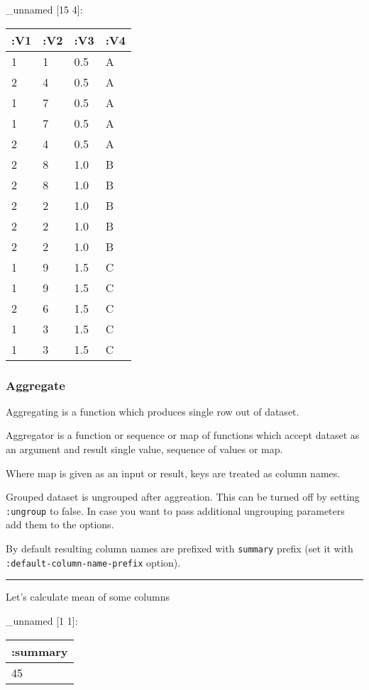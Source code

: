 \documentclass[]{article}
\newenvironment{Shaded}{\begin{snugshade}}{\end{snugshade}}
\newcommand{\AttributeTok}[1]{\textcolor[rgb]{0.77,0.63,0.00}{#1}}
\newcommand{\KeywordTok}[1]{\textcolor[rgb]{0.13,0.29,0.53}{\textbf{#1}}}
\newcommand{\NormalTok}[1]{#1}
\newcommand{\VariableTok}[1]{\textcolor[rgb]{0.00,0.00,0.00}{#1}}
\begin{document}
\_unnamed {[}15 4{]}:

\begin{longtable}[]{@{}llll@{}}
\toprule
:V1 & :V2 & :V3 & :V4\tabularnewline
\midrule
\endhead
1 & 1 & 0.5 & A\tabularnewline
2 & 4 & 0.5 & A\tabularnewline
1 & 7 & 0.5 & A\tabularnewline
1 & 7 & 0.5 & A\tabularnewline
2 & 4 & 0.5 & A\tabularnewline
2 & 8 & 1.0 & B\tabularnewline
2 & 8 & 1.0 & B\tabularnewline
2 & 2 & 1.0 & B\tabularnewline
2 & 2 & 1.0 & B\tabularnewline
2 & 2 & 1.0 & B\tabularnewline
1 & 9 & 1.5 & C\tabularnewline
1 & 9 & 1.5 & C\tabularnewline
2 & 6 & 1.5 & C\tabularnewline
1 & 3 & 1.5 & C\tabularnewline
1 & 3 & 1.5 & C\tabularnewline
\bottomrule
\end{longtable}

\hypertarget{aggregate}{%
\subsubsection{Aggregate}\label{aggregate}}

Aggregating is a function which produces single row out of dataset.

Aggregator is a function or sequence or map of functions which accept
dataset as an argument and result single value, sequence of values or
map.

Where map is given as an input or result, keys are treated as column
names.

Grouped dataset is ungrouped after aggreation. This can be turned off by
setting \texttt{:ungroup} to false. In case you want to pass additional
ungrouping parameters add them to the options.

By default resulting column names are prefixed with \texttt{summary}
prefix (set it with \texttt{:default-column-name-prefix} option).

\begin{center}\rule{0.5\linewidth}{0.5pt}\end{center}

Let's calculate mean of some columns

\begin{Shaded}
\end{Shaded}

\_unnamed {[}1 1{]}:

\begin{longtable}[]{@{}l@{}}
\toprule
:summary\tabularnewline
\midrule
\endhead
45\tabularnewline
\bottomrule
\end{longtable}
\end{document}

